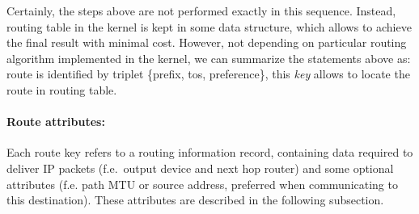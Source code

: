 Certainly, the steps above are not performed exactly
in this sequence. Instead, routing table in the kernel is kept
in some data structure, which allows to achieve the final result
with minimal cost. However, not depending on particular
routing algorithm implemented in the kernel, we can summarize
the statements above as: route is identified by triplet
\{prefix, tos, preference\}, this {\em key\/} allows to locate
the route in routing table.

\paragraph{Route attributes:} Each route key refers to a routing
information record, containing
data required to deliver IP packets (f.e.\ output device and
next hop router) and some optional attributes (f.e. path MTU or
source address, preferred when communicating to this destination).
These attributes are described in the following subsection.

